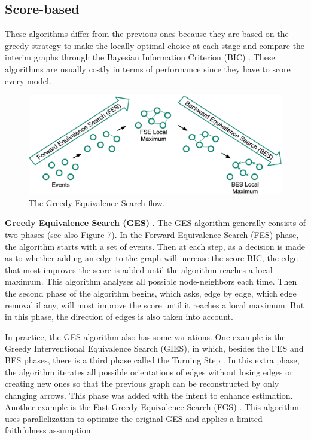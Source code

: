 \subsection{Score-based}
These algorithms differ from the previous ones because they are based on the greedy strategy to make the locally optimal choice at each stage and compare the interim graphs through the Bayesian Information Criterion (BIC) \cite{stoica2004model}. These algorithms are usually costly in terms of performance since they have to score every model.
\begin{figure}[H]
\centering
    \label{fig:ges}
    \includegraphics[width=\textwidth]{figures/ges.png}
    \caption{The Greedy Equivalence Search flow.}
\end{figure}
\textbf{Greedy Equivalence Search (GES)} \cite{chickering2002optimal}. The GES algorithm generally consists of two phases (see also Figure \hyperref[fig:ges]{7}). In the Forward Equivalence Search (FES) phase, the algorithm starts with a set of events. Then at each step, as a decision is made as to whether adding an edge to the graph will increase the score BIC, the edge that most improves the score is added until the algorithm reaches a local maximum. This algorithm analyses all possible node-neighbors each time. Then the second phase of the algorithm begins, which asks, edge by edge, which edge removal if any, will most improve the score until it reaches a local maximum. But in this phase, the direction of edges is also taken into account. \newline
	
In practice, the GES algorithm also has some variations. One example is the Greedy Interventional Equivalence Search (GIES), in which, besides the FES and BES phases, there is a third phase called the Turning Step \cite{hauser2012characterization}. In this extra phase, the algorithm iterates all possible orientations of edges without losing edges or creating new ones so that the previous graph can be reconstructed by only changing arrows. This phase was added with the intent to enhance estimation. Another example is the Fast Greedy Equivalence Search (FGS) \cite{ramsey2017million}. This algorithm uses parallelization to optimize the original GES and applies a limited faithfulness assumption.
